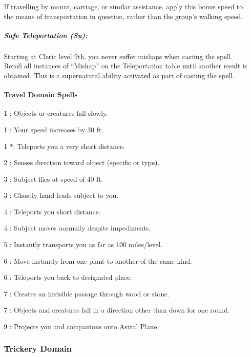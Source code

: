 If travelling by mount, carriage, or similar assistance, apply this bonus speed to the means of transportation in question, rather than the group's walking speed.
\subparagraph{Safe Teleportation (Su):}
Starting at Cleric level 9th, you never suffer mishaps when casting the  spell.
Reroll all instances of ``Mishap'' on the Teleportation table until another result is obtained.
This is a supernatural ability activated as part of casting the spell.
\paragraph{Travel Domain Spells}
\begin{list}{}{\leftmargin=1em}
\item[1] : Objects or creatures fall slowly.
\item[1] : Your speed increases by 30 ft.
\item[1] *: Teleports you a very short distance.
\item[2] : Senses direction toward object (specific or type).
\item[3] : Subject flies at speed of 40 ft.
\item[3] : Ghostly hand leads subject to you.
\item[4] : Teleports you short distance.
\item[4] : Subject moves normally despite impediments.
\item[5] : Instantly transports you as far as 100 miles/level.
\item[6] : Move instantly from one plant to another of the same kind.
\item[6] : Teleports you back to designated place.
\item[7] : Creates an invisible passage through wood or stone.
\item[7] : Objects and creatures fall in a direction other than down for one round.
\item[9] : Projects you and companions onto Astral Plane.
\end{list}
\subsubsection{Trickery Domain}

